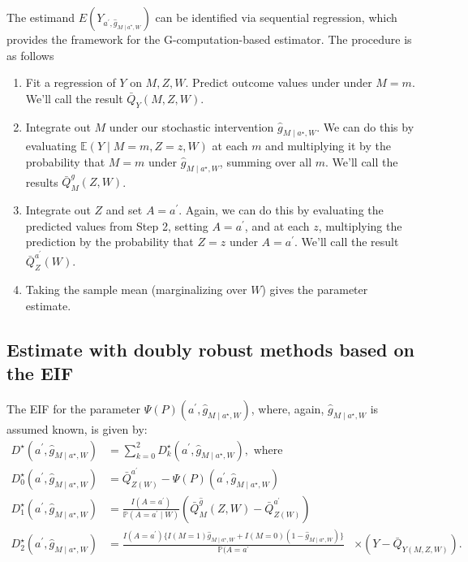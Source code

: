 \documentclass[
  12pt, krantz2,
]{book}
\providecommand{\tightlist}{%
  \setlength{\itemsep}{0pt}\setlength{\parskip}{0pt}}
\theoremstyle{definition}
\theoremstyle{definition}
\theoremstyle{definition}
\renewcommand{\P}{\mathbb{P}}
\newcommand{\E}{\mathbb{E}}
\newcommand{\1}{\mathbbm{1}}
\begin{document}
The estimand \(E(Y_{a^\prime, \hat{g}_{M \mid a^\star,W}})\) can be identified
via sequential regression, which provides the framework for the
G-computation-based estimator. The procedure is as follows

\begin{enumerate}
\def\labelenumi{\arabic{enumi}.}
\tightlist
\item
  Fit a regression of \(Y\) on \(M,Z,W\). Predict outcome values under under
  \(M=m\). We'll call the result \(\bar{Q}_Y(M,Z,W)\).
\item
  Integrate out \(M\) under our stochastic intervention
  \(\hat{g}_{M \mid a^{\star}, W}\). We can do this by evaluating
  \(\E(Y \mid M=m,Z=z,W)\) at each \(m\) and multiplying it by the probability
  that \(M=m\) under \(\hat{g}_{M \mid a^{\star}, W}\), summing over all \(m\).
  We'll call the results \(\bar{Q}^{g}_M(Z,W)\).
\item
  Integrate out \(Z\) and set \(A=a^\prime\). Again, we can do this by evaluating
  the predicted values from Step 2, setting \(A=a^\prime\), and at each \(z\),
  multiplying the prediction by the probability that \(Z=z\) under \(A=a^\prime\).
  We'll call the result \(\bar{Q}^{a^\prime}_Z(W)\).
\item
  Taking the sample mean (marginalizing over \(W\)) gives the parameter
  estimate.
\end{enumerate}

\hypertarget{estimate-with-doubly-robust-methods-based-on-the-eif}{%
\subsection{Estimate with doubly robust methods based on the EIF}\label{estimate-with-doubly-robust-methods-based-on-the-eif}}

The EIF for the parameter \(\Psi(P)(a^{\prime}, \hat{g}_{M \mid a^{\star},W})\),
where, again, \(\hat{g}_{M \mid a^{\star}, W}\) is assumed known, is given by:
\begin{align*}
  D^{\star}(a^{\prime}, \hat{g}_{M \mid a^{\star}, W}) &= \sum_{k=0}^2
      D_k^{\star}(a^{\prime}, \hat{g}_{M \mid a^{\star}, W}), \text{ where }\\
  D^{\star}_0(a^{\prime}, \hat{g}_{M \mid a^{\star}, W}) &=
      \bar{Q}^{a^{\prime}}_{Z(W)} -
      \Psi(P)(a^{\prime}, \hat{g}_{M \mid a^{\star}, W})\\
  D^{\star}_1(a^{\prime}, \hat{g}_{M \mid a^{\star}, W}) &=
      \frac{I(A=a^{\prime})}{\P(A=a^{\prime} \mid W)}(\bar{Q}^{\hat{g}}_M(Z,W)
      - \bar{Q}^{a^{\prime}}_{Z(W)})\\
  D^{\star}_2(a^{\prime}, \hat{g}_{M \mid a^{\star}, W}) &=
      \frac{I(A=a^{\prime})\{I(M=1) \hat{g}_{M \mid a^{\star}, W} +
      I(M=0)(1-\hat{g}_{M \mid a^{\star}, W}) \}}{\P(A=a^{\prime}}
      &\times (Y-\bar{Q}_{Y(M,Z,W)}).
\end{align*}
\end{document}

